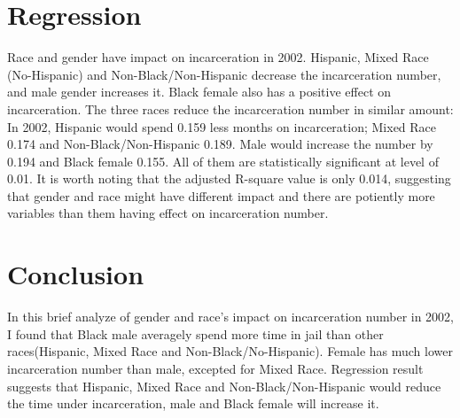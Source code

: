 \documentclass{article}
\begin{document}


\newpage

\section{Regression}

Race and gender have impact on incarceration in 2002. Hispanic, Mixed Race (No-Hispanic) and Non-Black/Non-Hispanic decrease the incarceration number, and male gender increases it. Black female also has a positive effect on incarceration.
The three races reduce the incarceration number in similar amount: In 2002, Hispanic would spend 0.159 less months on incarceration; Mixed Race 0.174 and Non-Black/Non-Hispanic 0.189. Male would increase the number by 0.194 and Black female 0.155. All of them are statistically significant at level of 0.01.
It is worth noting that the adjusted R-square value is only 0.014, suggesting that gender and race might have different impact and there are potiently more variables than them having effect on incarceration number. 



\newpage

\section{Conclusion}

In this brief analyze of gender and race's impact on incarceration number in 2002, I found that Black male averagely spend more time in jail than other races(Hispanic, Mixed Race and Non-Black/No-Hispanic). Female has much lower incarceration number than male, excepted for Mixed Race. 
Regression result suggests that Hispanic, Mixed Race and Non-Black/Non-Hispanic would reduce the time under incarceration, male and Black female will increase it. 
\end{document}
